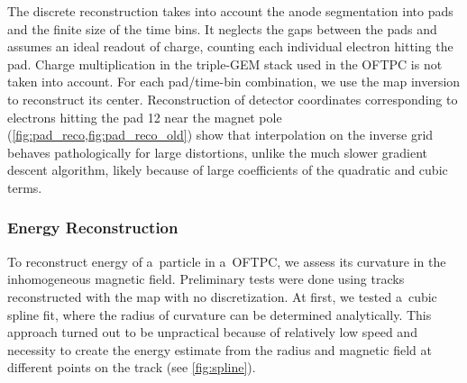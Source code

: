 		The discrete reconstruction takes into account the anode segmentation into pads and the finite size of the time bins. It neglects the gaps between the pads and assumes an ideal readout of charge, counting each individual electron hitting the pad. Charge multiplication in the triple-\ac{GEM} stack used in the \ac{OFTPC} is not taken into account. For each pad/time-bin combination, we use the map inversion to reconstruct its center. Reconstruction of detector coordinates corresponding to electrons hitting the pad 12 near the magnet pole (\cref{fig:pad_reco,fig:pad_reco_old}) show that interpolation on the inverse grid behaves pathologically for large distortions, unlike the much slower gradient descent algorithm, likely because of large coefficients of the quadratic and cubic terms.
		
	\subsubsection*{Energy Reconstruction}
		To reconstruct energy of a~particle in a~\ac{OFTPC}, we assess its curvature in the inhomogeneous magnetic field. Preliminary tests were done using tracks reconstructed with the map with no discretization. At first, we tested a~cubic spline fit, where the radius of curvature can be determined analytically. This approach turned out to be unpractical because of relatively low speed and necessity to create the energy estimate from the radius and magnetic field at different points on the track (see \cref{fig:spline}).
		
